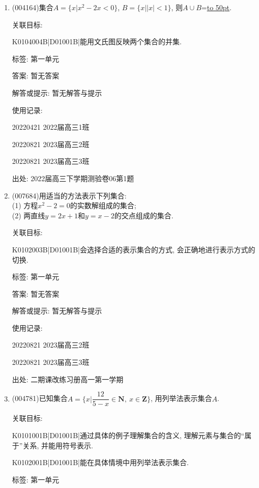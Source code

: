 \documentclass[10pt,a4paper]{article}
\newcommand{\blank}[1]{\underline{\hbox to #1pt{}}}
\begin{document}
\begin{enumerate}[1.]

\item { (004164)}集合$A=\{x|x^2-2x<0\}$, $B=\{x||x|<1\}$, 则$A\cup B$=\blank{50}.


关联目标:

K0104004B|D01001B|能用文氏图反映两个集合的并集.



标签: 第一单元

答案: 暂无答案

解答或提示: 暂无解答与提示

使用记录:

20220421	2022届高三1班	

20220821	2023届高三2班	

20220821	2023届高三3班	


出处: 2022届高三下学期测验卷06第1题
\item { (007684)}用适当的方法表示下列集合:\\
(1) 方程$x^2-2=0$的实数解组成的集合;\\
(2) 两直线$y=2x+1$和$y=x-2$的交点组成的集合.


关联目标:

K0102003B|D01001B|会选择合适的表示集合的方式, 会正确地进行表示方式的切换.



标签: 第一单元

答案: 暂无答案

解答或提示: 暂无解答与提示

使用记录:

20220821	2023届高三2班	

20220821	2023届高三3班		


出处: 二期课改练习册高一第一学期
\item { (004781)}已知集合$A=\{x|\dfrac{12}{5-x}\in \mathbf{N},\ x\in\mathbf{Z}\}$, 用列举法表示集合$A$.


关联目标:

K0101001B|D01001B|通过具体的例子理解集合的含义, 理解元素与集合的``属于''关系, 并能用符号表示.

K0102001B|D01001B|能在具体情境中用列举法表示集合.



标签: 第一单元


\end{enumerate}
\end{document}
